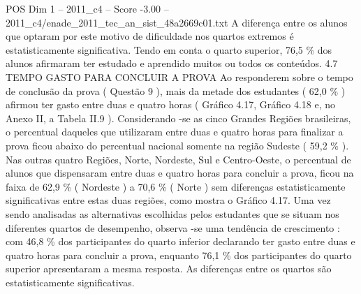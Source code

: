 \begin{textsample}{POS Dim 1 – 2011\_c4 – Score -3.00 – 2011\_c4/enade\_2011\_tec\_an\_sist\_48a2669c01.txt}
A diferença entre os alunos que optaram por este motivo de dificuldade nos quartos extremos é estatisticamente significativa.
Tendo em conta o quarto superior, 76,5 \% dos alunos afirmaram ter estudado e aprendido muitos ou todos os conteúdos. 4.7 TEMPO GASTO PARA CONCLUIR A PROVA Ao responderem sobre o tempo de conclusão da prova ( Questão 9 ), mais da metade dos estudantes ( 62,0 \% ) afirmou ter gasto entre duas e quatro horas ( Gráfico 4.17, Gráfico 4.18 e, no Anexo II, a Tabela II.9 ).
Considerando -se as cinco Grandes Regiões brasileiras, o percentual daqueles que utilizaram entre duas e quatro horas para finalizar a prova ficou abaixo do percentual nacional somente na região Sudeste ( 59,2 \% ).
Nas outras quatro Regiões, Norte, Nordeste, Sul e Centro-Oeste, o percentual de alunos que dispensaram entre duas e quatro horas para concluir a prova, ficou na faixa de 62,9 \% ( Nordeste ) a 70,6 \% ( Norte ) sem diferenças estatisticamente significativas entre estas duas regiões, como mostra o Gráfico 4.17.
Uma vez sendo analisadas as alternativas escolhidas pelos estudantes que se situam nos diferentes quartos de desempenho, observa -se uma tendência de crescimento : com 46,8 \% dos participantes do quarto inferior declarando ter gasto entre duas e quatro horas para concluir a prova, enquanto 76,1 \% dos participantes do quarto superior apresentaram a mesma resposta.
As diferenças entre os quartos são estatisticamente significativas.

\end{textsample}
